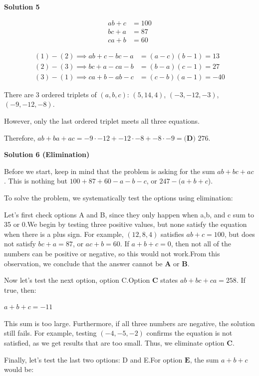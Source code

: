 \begin{enumerate}
\textbf{Solution 5}


 \begin{align} ab + c &= 100 \\ bc + a &= 87 \\ ca + b &= 60 \end{align}

 \begin{align*}(1) - (2) \implies ab + c -bc - a &=(a-c)(b-1)=13 \\(2) - (3) \implies bc + a -ca - b &=(b-a)(c-1)=27 \\(3) - (1) \implies ca + b -ab - c &=(c-b)(a-1)=-40\end{align*}


 There are $3$ ordered triplets of $(a,b,c)$: $(5,14,4)$, $(-3,-12,-3)$, $(-9,-12,-8)$. 

 However, only the last ordered triplet meets all three equations.

 Therefore, $ab+ba+ac= -9\cdot-12+-12\cdot-8+-8\cdot-9 = \boxed{\textbf{(D) }276}.$




\textbf{Solution 6 (Elimination)}

Before we start, keep in mind that the problem is asking for the sum \(ab+bc+ac\). This is nothing but \(100+87+60-a-b-c\), or \(247-(a+b+c\)). 

 To solve the problem, we systematically test the options using elimination:

 Let's first check options A and B, since they only happen when a,b, and c sum to 35 or 0.We begin by testing three positive values, but none satisfy the equation when there is a plus sign. For example, \( (12, 8, 4) \) satisfies \( ab + c = 100 \), but does not satisfy \( bc + a = 87\), or \( ac + b = 60\). If \(a+b+c=0\), then not all of the numbers can be positive or negative, so this would not work.From this observation, we conclude that the answer cannot be \( \textbf{A} \) or \( \textbf{B} \).

 Now let's test the next option, option C.Option \( \textbf{C} \) states \( ab + bc + ca = 258 \). If true, then:

 \(a + b + c = -11\)

 This sum is too large. Furthermore, if all three numbers are negative, the solution still fails. For example, testing \( (-4, -5, -2) \) confirms the equation is not satisfied, as we get results that are too small. Thus, we eliminate option \( \textbf{C} \).

 Finally, let's test the last two options: D and E.For option \( \textbf{E} \), the sum \( a + b + c \) would be:


\end{enumerate}
